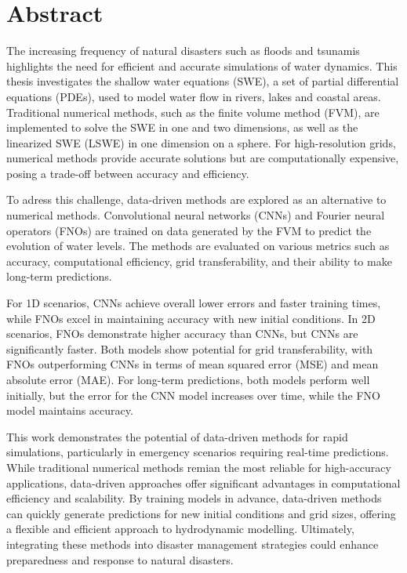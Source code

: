 \chapter*{Abstract}

The increasing frequency of natural disasters such as floods and tsunamis highlights the need for efficient and accurate simulations of water dynamics.
This thesis investigates the shallow water equations (SWE), a set of partial differential equations (PDEs), used to model water flow in rivers, lakes and coastal areas.
Traditional numerical methods, such as the finite volume method (FVM), are implemented to solve the SWE in one and two dimensions, as well as the linearized SWE (LSWE) in one dimension on a sphere.
For high-resolution grids, numerical methods provide accurate solutions but are computationally expensive, posing a trade-off between accuracy and efficiency.

\noindent To adress this challenge, data-driven methods are explored as an alternative to numerical methods.
Convolutional neural networks (CNNs) and Fourier neural operators (FNOs) are trained on data generated by the FVM to predict the evolution of water levels.
The methods are evaluated on various metrics such as accuracy, computational efficiency, grid transferability, and their ability to make long-term predictions.

\noindent For 1D scenarios, CNNs achieve overall lower errors and faster training times, while FNOs excel in maintaining accuracy with new initial conditions.
In 2D scenarios, FNOs demonstrate higher accuracy than CNNs, but CNNs are significantly faster.
Both models show potential for grid transferability, with FNOs outperforming CNNs in terms of mean squared error (MSE) and mean absolute error (MAE).
For long-term predictions, both models perform well initially, but the error for the CNN model increases over time, while the FNO model maintains accuracy.

\noindent 
This work demonstrates the potential of data-driven methods for rapid simulations, particularly in emergency scenarios requiring real-time predictions.
While traditional numerical methods remian the most reliable for high-accuracy applications, data-driven approaches offer significant advantages in computational efficiency and scalability.
By training models in advance, data-driven methods can quickly generate predictions for new initial conditions and grid sizes, offering a flexible and efficient approach to hydrodynamic modelling.
Ultimately, integrating these methods into disaster management strategies could enhance preparedness and response to natural disasters.




